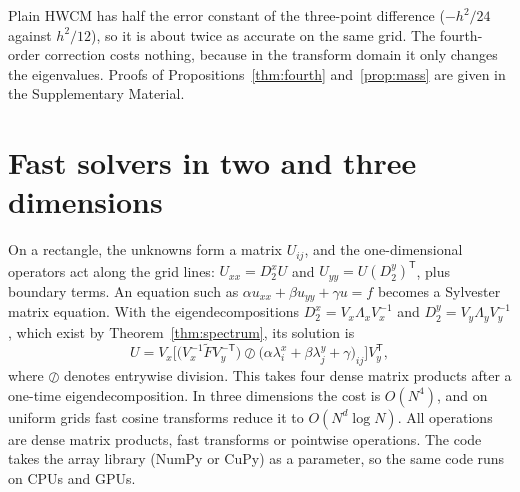 \documentclass[smallextended,envcountsame]{svjour3}
\begin{document}
Plain HWCM has half the error constant of the three-point difference ($-h^2/24$ against $h^2/12$), so it is
about twice as accurate on the same grid. The fourth-order correction costs nothing, because in the
transform domain it only changes the eigenvalues. Proofs of Propositions~\ref{thm:fourth}
and~\ref{prop:mass} are given in the Supplementary Material.

\section{Fast solvers in two and three dimensions}\label{sec:tensor}
On a rectangle, the unknowns form a matrix $U_{ij}$, and the one-dimensional operators act along the grid
lines: $U_{xx}=D_2^xU$ and $U_{yy}=U(D_2^y)^{\mathsf T}$, plus boundary terms. An equation such as
$\alpha u_{xx}+\beta u_{yy}+\gamma u=f$ becomes a Sylvester matrix equation. With the eigendecompositions
$D_2^x=V_x\Lambda_xV_x^{-1}$ and $D_2^y=V_y\Lambda_yV_y^{-1}$, which exist by Theorem~\ref{thm:spectrum},
its solution is
\begin{equation}\label{eq:fdm}
U=V_x\Big[\big(V_x^{-1}\tilde FV_y^{-\mathsf T}\big)\oslash\big(\alpha\lambda^x_i+\beta\lambda^y_j+\gamma\big)_{ij}\Big]V_y^{\mathsf T},
\end{equation}
where $\oslash$ denotes entrywise division. This takes four dense matrix products after a one-time
eigendecomposition. In three dimensions the cost is $O(N^4)$, and on uniform grids fast cosine
transforms reduce it to $O(N^d\log N)$. All operations are dense matrix products, fast transforms or
pointwise operations. The code takes the array library (NumPy or CuPy) as a parameter, so the same code
runs on CPUs and GPUs.

\end{document}
